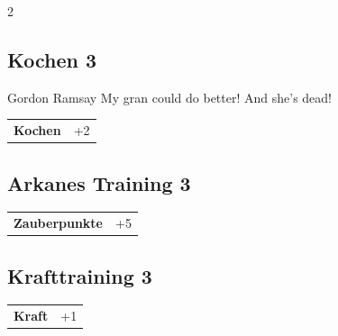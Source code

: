 \begin{multicols}{2}
\begin{tcolorbox}
\end{tcolorbox}

\begin{tcolorbox}
    \subsection*{Kochen \hfill \small{3 }}
    \tcblower


\begin{pquote}{Gordon Ramsay}
My gran could do better! And she’s dead!
\end{pquote}

\vspace{3mm}

\begin{tabular}{@{}ll@{}}
    \textbf{Kochen} & +2\\
\end{tabular}


\end{tcolorbox}

\begin{tcolorbox}
    \subsection*{Arkanes Training \hfill \small{3 }}
    \tcblower




\begin{tabular}{@{}ll@{}}
    \textbf{Zauberpunkte} & +5\\
\end{tabular}


\end{tcolorbox}

\begin{tcolorbox}
    \subsection*{Krafttraining \hfill \small{3 }}
    \tcblower




\begin{tabular}{@{}ll@{}}
    \textbf{Kraft} & +1\\
\end{tabular}


\end{tcolorbox}
\end{multicols}

